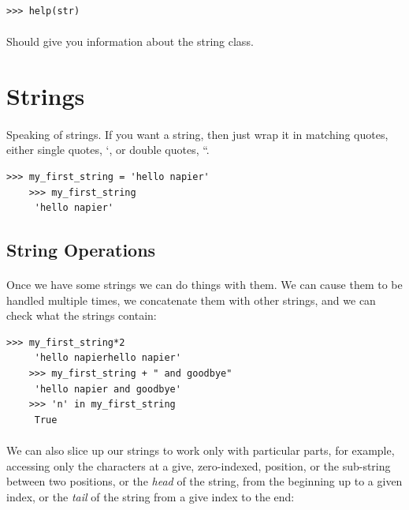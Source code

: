 \documentclass[12pt, a4paper, oneside]{book}
\begin{document}
\begin{lstlisting}[style=DOS]
    >>> help(str)
\end{lstlisting}

\paragraph{} Should give you information about the string class.

\section{Strings}
\label{strings}

\paragraph{} Speaking of strings. If you want a string, then just wrap it in matching quotes, either single quotes, `, or double quotes, ``.

\begin{lstlisting}[style=DOS]
    >>> my_first_string = 'hello napier'
    >>> my_first_string
     'hello napier'
\end{lstlisting}

\subsection{String Operations}
\paragraph{} Once we have some strings we can do things with them. We can cause them to be handled multiple times, we concatenate them with other strings, and we can check what the strings contain:

\begin{lstlisting}[style=DOS]
    >>> my_first_string*2
     'hello napierhello napier'
    >>> my_first_string + " and goodbye"
     'hello napier and goodbye'
    >>> 'n' in my_first_string
     True
\end{lstlisting}

\paragraph{} We can also slice up our strings to work only with particular parts, for example, accessing only the characters at a give, zero-indexed, position, or the sub-string between two positions, or the \emph{head} of the string, from the beginning up to a given index, or the \emph{tail} of the string from a give index to the end:
\end{document}
